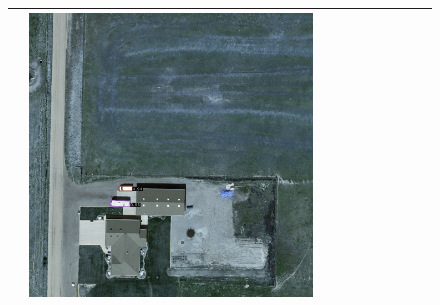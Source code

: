 \begin{figure}[H]
\begin{tabularx}{\textwidth}{c|*{9}{X}}
    & \includegraphics[trim={300pt 355pt 610pt 570pt},clip,width=\linewidth]{images/015Results/02perm_exp/comp_images/rgbir/198.png} \\ \hline


\end{tabularx}
\end{figure}
